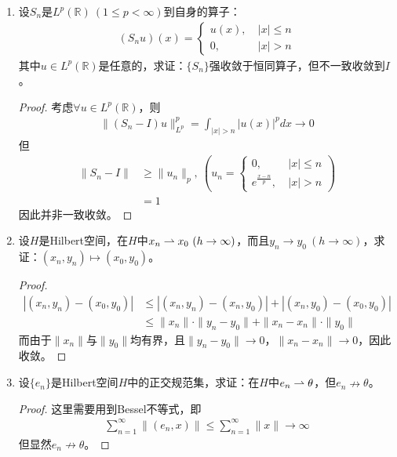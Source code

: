 \begin{enumerate}[leftmargin=2cm, label=\arabic*]
		\item 设$S_n$是$L^p(\mathbb{R})\ (1\leqslant p<\infty)$到自身的算子：
		\begin{align*}
			(S_n u) (x) = \left\lbrace\begin{array}{ll}
				u(x), & \ |x| \leqslant n \\
				0, &\ |x| > n
			\end{array} \right.
		\end{align*}
		其中$u\in L^p(\mathbb{R})$是任意的，求证：$\{S_n\}$强收敛于恒同算子，但不一致收敛到$I$。
		\begin{proof}
			考虑$\forall u\in L^p(\mathbb{R})$，则
			\begin{align*}
				\|(S_n - I)u\|_{L^p}^p = \int_{|x| > n} |u(x)|^p dx \to 0
			\end{align*}
			但
			\begin{align*}
				\|S_n - I\| &\geqslant \|u_n\|_p,\ \left(u_n = \left\lbrace\begin{array}{ll}
					0, &\ |x|\leqslant n \\
					e^{\frac{x-n}{p}}, &\ |x| > n
				\end{array} \right.\right) \\
				& = 1 
			\end{align*}
			因此并非一致收敛。
		\end{proof}
		
		\item 设$H$是Hilbert空间，在$H$中$x_n\weak x_0\ (h\to\infty)$，而且$y_n\to y_0\ (h\to\infty)$，求证：$(x_n,y_n)\mapsto (x_0,y_0)$。
		\begin{proof}
			\begin{align*}
				|(x_n,y_n) - (x_0,y_0)| & \leqslant |(x_n,y_n) - (x_n, y_0)| + |(x_n, y_0) - (x_0,y_0)| \\
				& \leqslant \|x_n\|\cdot\|y_n - y_0\| + \|x_n - x_n\|\cdot \|y_0\| 
			\end{align*}
			而由于$\|x_n\|$与$\|y_0\|$均有界，且$\|y_n - y_0\|\to 0$，$\|x_n - x_n\|\to 0$，因此收敛。
		\end{proof}
		
		\item 设$\{e_n\}$是Hilbert空间$H$中的正交规范集，求证：在$H$中$e_n\rightharpoonup \theta$，但$e_n \nrightarrow\theta$。
		\begin{proof}
			这里需要用到Bessel不等式，即
			\begin{align*}
				\sum\limits_{n=1}^{\infty} \|(e_n, x)\| \leqslant \sum\limits_{n=1}^{\infty} \|x\| \to \infty
			\end{align*}
			但显然$e_n \nrightarrow \theta$。
		\end{proof}
		

\end{enumerate}
